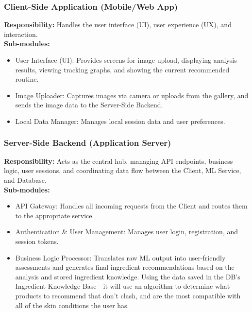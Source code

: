 \documentclass[12pt,a4paper]{article}
\begin{document}
\subsubsection{Client-Side Application (Mobile/Web App)}
\textbf{Responsibility:} Handles the user interface (UI), user experience (UX), and interaction.\\
\textbf{Sub-modules:}
\begin{itemize}
    \item User Interface (UI): Provides screens for image upload, displaying analysis results, viewing tracking graphs, and showing the current recommended routine.
    \item Image Uploader: Captures images via camera or uploads from the gallery, and sends the image data to the Server-Side Backend.
    \item Local Data Manager: Manages local session data and user preferences.
\end{itemize}

\subsubsection{Server-Side Backend (Application Server)}
\textbf{Responsibility:} Acts as the central hub, managing API endpoints, business logic, user sessions, and coordinating data flow between the Client, ML Service, and Database.\\
\textbf{Sub-modules:}
\begin{itemize}
    \item API Gateway: Handles all incoming requests from the Client and routes them to the appropriate service.
    \item Authentication \& User Management: Manages user login, registration, and session tokens.
    \item Business Logic Processor: Translates raw ML output into user-friendly assessments and generates final ingredient recommendations based on the analysis and stored ingredient knowledge. Using the data saved in the DB's Ingredient Knowledge Base - it will use an algorithm to determine what products to recommend that don't clash, and are the most compatible with all of the skin conditions the user has.
\end{itemize}
\end{document}
